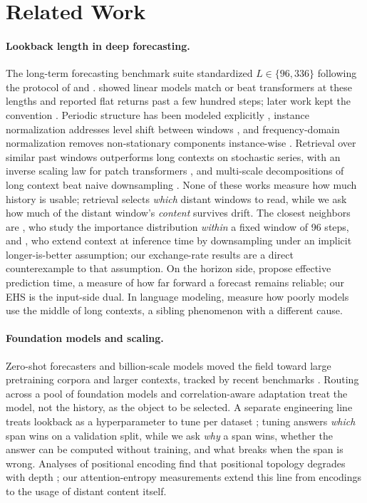 \section{Related Work}
\label{sec:related}

\paragraph{Lookback length in deep forecasting.}
The long-term forecasting benchmark suite standardized $L \in \{96, 336\}$ following the protocol of \citet{informer} and \citet{autoformer}. \citet{dlinear} showed linear models match or beat transformers at these lengths and reported flat returns past a few hundred steps; later work kept the convention \citep{patchtst, timesnet, itransformer, timemixer}. Periodic structure has been modeled explicitly \citep{cyclenet, koopa}, instance normalization addresses level shift between windows \citep{revin}, and frequency-domain normalization removes non-stationary components instance-wise \citep{fan}. Retrieval over similar past windows outperforms long contexts on stochastic series, with an inverse scaling law for patch transformers \citep{raft, inversescaling}, and multi-scale decompositions of long context beat naive downsampling \citep{contextbottleneck}. None of these works measure how much history is usable; retrieval selects \emph{which} distant windows to read, while we ask how much of the distant window's \emph{content} survives drift. The closest neighbors are \citet{tamer}, who study the importance distribution \emph{within} a fixed window of 96 steps, and \citet{sprint}, who extend context at inference time by downsampling under an implicit longer-is-better assumption; our exchange-rate results are a direct counterexample to that assumption. On the horizon side, \citet{fern} propose effective prediction time, a measure of how far forward a forecast remains reliable; our EHS is the input-side dual. In language modeling, \citet{lostinthemiddle} measure how poorly models use the middle of long contexts, a sibling phenomenon with a different cause.

\paragraph{Foundation models and scaling.}
Zero-shot forecasters \citep{chronos, timesfm} and billion-scale models \citep{toto2} moved the field toward large pretraining corpora and larger contexts, tracked by recent benchmarks \citep{gifteval, timebench}. Routing across a pool of foundation models \citep{timerouter} and correlation-aware adaptation \citep{cora} treat the model, not the history, as the object to be selected. A separate engineering line treats lookback as a hyperparameter to tune per dataset \citep{timemixer, letsforecast}; tuning answers \emph{which} span wins on a validation split, while we ask \emph{why} a span wins, whether the answer can be computed without training, and what breaks when the span is wrong. Analyses of positional encoding find that positional topology degrades with depth \citep{tem, pesurvey}; our attention-entropy measurements extend this line from encodings to the usage of distant content itself.

